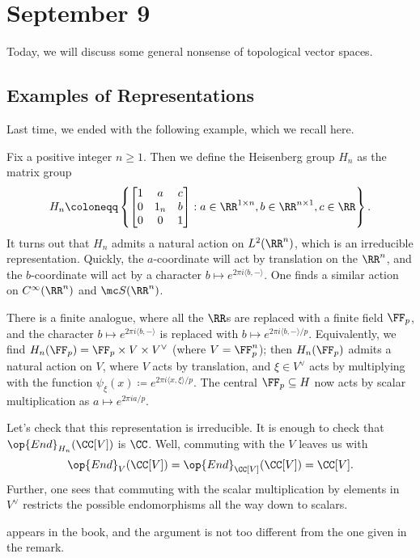 \documentclass[../notes.tex]{subfiles}
\begin{document}
\section{September 9}
Today, we will discuss some general nonsense of topological vector spaces.

\subsection{Examples of Representations}
Last time, we ended with the following example, which we recall here.
\begin{example} \label{ex:real-heisenberg}
	Fix a positive integer $n\ge1$. Then we define the Heisenberg group $H_n$ as the matrix group
	\[H_n\coloneqq\left\{\begin{bmatrix}
		1 & a & c \\
		0 & 1_n & b \\
		0 & 0 & 1
	\end{bmatrix}:a\in\RR^{1\times n},b\in\RR^{n\times1},c\in\RR\right\}.\]
	It turns out that $H_n$ admits a natural action on $L^2(\RR^n)$, which is an irreducible representation. Quickly, the $a$-coordinate will act by translation on the $\RR^n$, and the $b$-coordinate will act by a character $b\mapsto e^{2\pi i\langle b,-\rangle}$. One finds a similar action on $C^\infty(\RR^n)$ and $\mc S(\RR^n)$.
\end{example}
\begin{remark}
	There is a finite analogue, where all the $\RR$s are replaced with a finite field $\FF_p$, and the character $b\mapsto e^{2\pi i\langle b,-\rangle}$ is replaced with $b\mapsto e^{2\pi i\langle b,-\rangle/p}$. Equivalently, we find $H_n(\FF_p)=\FF_p\times V\times V^\lor$ (where $V=\FF_p^n$); then $H_n(\FF_p)$ admits a natural action on $V$, where $V$ acts by translation, and $\xi\in V^\lor$ acts by multiplying with the function $\psi_\xi(x)\coloneqq e^{2\pi i\langle x,\xi\rangle/p}$. The central $\FF_p\subseteq H$ now acts by scalar multiplication as $a\mapsto e^{2\pi ia/p}$.

	Let's check that this representation is irreducible. It is enough to check that $\op{End}_{H_n}(\CC[V])$ is $\CC$. Well, commuting with the $V$ leaves us with
	\[\op{End}_V(\CC[V])=\op{End}_{\CC[V]}(\CC[V])=\CC[V].\]
	Further, one sees that commuting with the scalar multiplication by elements in $V^\lor$ restricts the possible endomorphisms all the way down to scalars.
\end{remark}
 appears in the book, and the argument is not too different from the one given in the remark.
\end{document}
